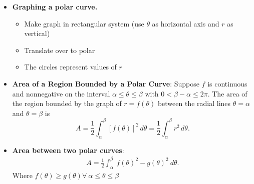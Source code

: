 \documentclass{report}
\begin{document}
\begin{itemize}
     \pagebreak 
    \item \textbf{Graphing a polar curve.}
        \begin{itemize}
            \item Make graph in rectangular system (use $\theta$ as horizontal axis and $r$ as vertical)
            \item Translate over to polar
            \item The circles represent values of $r$
        \end{itemize}
        \item \textbf{Area of a Region Bounded by a Polar Curve}:
             Suppose \( f \) is continuous and nonnegative on the interval \( \alpha \leq \theta \leq \beta \) with \( 0 < \beta - \alpha \leq 2\pi \). The area of the region bounded by the graph of \( r = f(\theta) \) between the radial lines \( \theta = \alpha \) and \( \theta = \beta \) is
                \[ A = \frac{1}{2} \int_{\alpha}^{\beta} [f(\theta)]^2 \, d\theta = \frac{1}{2} \int_{\alpha}^{\beta} r^2 \, d\theta. \]
        \item \textbf{Area between two polar curves}:
            \begin{align*}
                A = \frac{1}{2}\int_{\alpha}^{\beta}\ f(\theta)^{2} -g(\theta )^{2}\ d\theta 
            .\end{align*}
            Where $f(\theta ) \geq g(\theta ) \forall\ \alpha \leq \theta \leq \beta $


\end{itemize}
\end{document}
